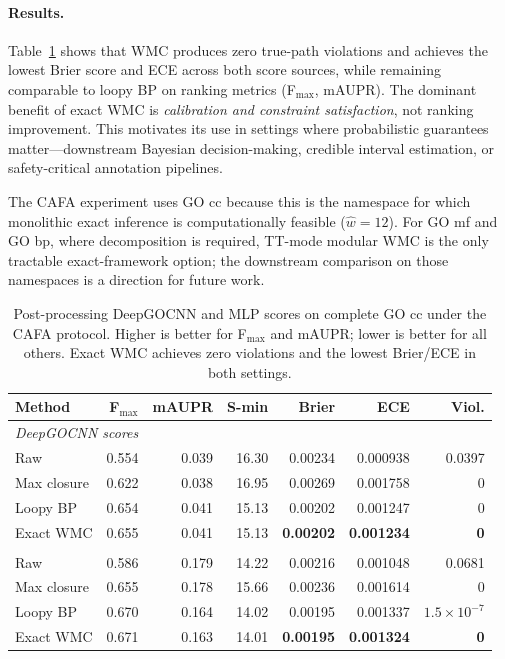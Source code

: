 \documentclass[12pt]{article}
\begin{document}
\paragraph{Results.}
Table~\ref{tab:downstream} shows that WMC produces zero true-path
violations and achieves the lowest Brier score and ECE across both
score sources, while remaining comparable to loopy BP on ranking
metrics (F$_{\max}$, mAUPR). The dominant benefit of exact WMC
is \emph{calibration and constraint satisfaction}, not ranking
improvement. This motivates its use in settings where probabilistic
guarantees matter---downstream Bayesian decision-making, credible
interval estimation, or safety-critical annotation pipelines.

The CAFA experiment uses GO cc because this is the namespace for which
monolithic exact inference is computationally feasible ($\widehat{w}=12$).
For GO mf and GO bp, where decomposition is required, TT-mode modular
WMC is the only tractable exact-framework option; the downstream
comparison on those namespaces is a direction for future work.

\begin{table}[t]
\centering
\small
\setlength{\tabcolsep}{4pt}
\begin{tabular}{lrrrrrr}
\toprule
Method & F$_{\max}$ & mAUPR & S-min & Brier & ECE & Viol. \\
\midrule
\multicolumn{7}{l}{\textit{DeepGOCNN scores}} \\
Raw          & 0.554 & 0.039 & 16.30 & 0.00234 & 0.000938 & 0.0397 \\
Max closure  & 0.622 & 0.038 & 16.95 & 0.00269 & 0.001758 & 0 \\
Loopy BP     & 0.654 & 0.041 & 15.13 & 0.00202 & 0.001247 & 0 \\
Exact WMC    & 0.655 & 0.041 & 15.13 & \textbf{0.00202} & \textbf{0.001234} & \textbf{0} \\
\addlinespace
\multicolumn{7}{l}{\textit{MLP scores}} \\
Raw          & 0.586 & 0.179 & 14.22 & 0.00216 & 0.001048 & 0.0681 \\
Max closure  & 0.655 & 0.178 & 15.66 & 0.00236 & 0.001614 & 0 \\
Loopy BP     & 0.670 & 0.164 & 14.02 & 0.00195 & 0.001337 & $1.5{\times}10^{-7}$ \\
Exact WMC    & 0.671 & 0.163 & 14.01 & \textbf{0.00195} & \textbf{0.001324} & \textbf{0} \\
\bottomrule
\end{tabular}
\caption{Post-processing DeepGOCNN and MLP scores on complete GO cc
under the CAFA protocol. Higher is better for F$_{\max}$ and mAUPR;
lower is better for all others. Exact WMC achieves zero violations and
the lowest Brier/ECE in both settings.}
\label{tab:downstream}
\end{table}
\end{document}
